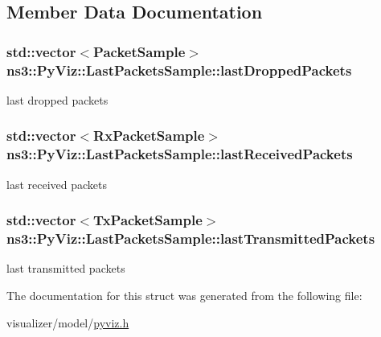 \subsection{Member Data Documentation}
\subsubsection[{\texorpdfstring{last\+Dropped\+Packets}{lastDroppedPackets}}]{\setlength{\rightskip}{0pt plus 5cm}std\+::vector$<${\bf Packet\+Sample}$>$ ns3\+::\+Py\+Viz\+::\+Last\+Packets\+Sample\+::last\+Dropped\+Packets}\hypertarget{structns3_1_1PyViz_1_1LastPacketsSample_a1c8ee7a178401b96aa8810767aa079d4}{}\label{structns3_1_1PyViz_1_1LastPacketsSample_a1c8ee7a178401b96aa8810767aa079d4}


last dropped packets 

\subsubsection[{\texorpdfstring{last\+Received\+Packets}{lastReceivedPackets}}]{\setlength{\rightskip}{0pt plus 5cm}std\+::vector$<${\bf Rx\+Packet\+Sample}$>$ ns3\+::\+Py\+Viz\+::\+Last\+Packets\+Sample\+::last\+Received\+Packets}\hypertarget{structns3_1_1PyViz_1_1LastPacketsSample_a9ec164d0f5c8e1db960388fed89b74ad}{}\label{structns3_1_1PyViz_1_1LastPacketsSample_a9ec164d0f5c8e1db960388fed89b74ad}


last received packets 

\subsubsection[{\texorpdfstring{last\+Transmitted\+Packets}{lastTransmittedPackets}}]{\setlength{\rightskip}{0pt plus 5cm}std\+::vector$<${\bf Tx\+Packet\+Sample}$>$ ns3\+::\+Py\+Viz\+::\+Last\+Packets\+Sample\+::last\+Transmitted\+Packets}\hypertarget{structns3_1_1PyViz_1_1LastPacketsSample_a9b2c257224892a935b1c5448d04d44c3}{}\label{structns3_1_1PyViz_1_1LastPacketsSample_a9b2c257224892a935b1c5448d04d44c3}


last transmitted packets 



The documentation for this struct was generated from the following file\+:\begin{DoxyCompactItemize}
\item 
visualizer/model/\hyperlink{pyviz_8h}{pyviz.\+h}\end{DoxyCompactItemize}
